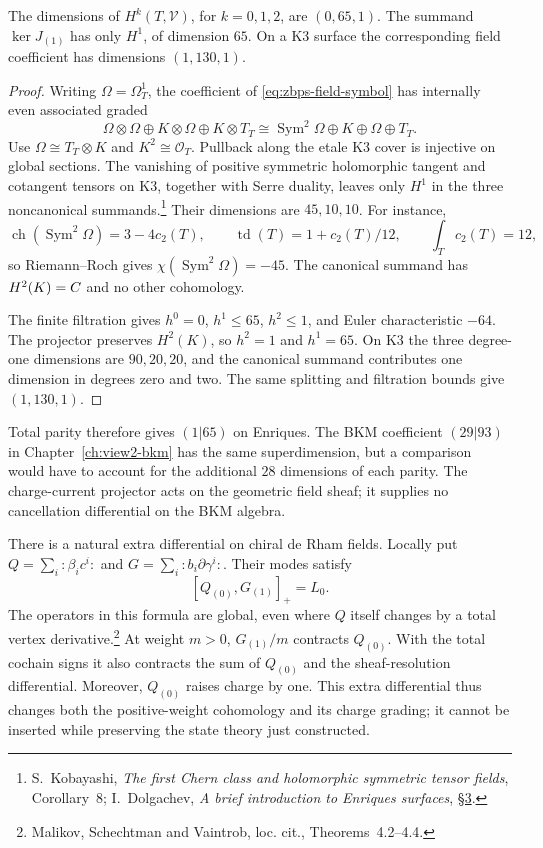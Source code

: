 \begin{theorem}\label{thm:zbps-enriques-coefficient}
The dimensions of \(H^k(T,\mathscr V)\), for \(k=0,1,2\), are
\((0,65,1)\).  The summand \(\ker J_{(1)}\) has only
\(H^1\), of dimension \(65\).  On a K3 surface the corresponding
field coefficient has dimensions \((1,130,1)\).
\end{theorem}
\begin{proof}
Writing \(\Omega=\Omega_T^1\), the coefficient of
\eqref{eq:zbps-field-symbol} has internally even associated graded
\[
 \Omega\otimes\Omega\oplus K\otimes\Omega\oplus K\otimes T_T
 \cong\operatorname{Sym}^2\Omega\oplus K\oplus\Omega\oplus T_T.
\]
Use \(\Omega\cong T_T\otimes K\) and \(K^2\cong\mathcal O_T\).
Pullback along the etale K3 cover is injective on global sections.
The vanishing of positive symmetric holomorphic tangent and
cotangent tensors on K3, together with Serre duality, leaves only
\(H^1\) in the three noncanonical summands.\footnote{
S.~Kobayashi, \emph{The first Chern class and holomorphic symmetric
tensor fields}, Corollary~8; I.~Dolgachev, \emph{A brief introduction
to Enriques surfaces}, \href{https://arxiv.org/abs/1412.7744}{\S3}.}
Their dimensions are \(45,10,10\).  For instance,
\[
 \operatorname{ch}(\operatorname{Sym}^2\Omega)=3-4c_2(T),
 \qquad \operatorname{td}(T)=1+c_2(T)/12,
 \qquad \int_Tc_2(T)=12,
\]
so Riemann--Roch gives \(\chi(\operatorname{Sym}^2\Omega)=-45\).
The canonical summand has \(H^2(K)=C\) and no other cohomology.

The finite filtration gives \(h^0=0\), \(h^1\le65\),
\(h^2\le1\), and Euler characteristic \(-64\).
The projector preserves \(H^2(K)\), so \(h^2=1\) and
\(h^1=65\).  On K3 the three degree-one dimensions are
\(90,20,20\), and the canonical summand contributes one dimension
in degrees zero and two.  The same splitting and filtration bounds
give \((1,130,1)\).
\end{proof}

Total parity therefore gives \((1|65)\) on Enriques.  The BKM
coefficient \((29|93)\) in Chapter~\ref{ch:view2-bkm} has the same
superdimension, but a comparison would have to account for the
additional \(28\) dimensions of each parity.  The charge-current
projector acts on the geometric field sheaf; it supplies no
cancellation differential on the BKM algebra.

There is a natural extra differential on chiral de Rham fields.
Locally put \(Q=\sum_i:\beta_i c^i:\) and
\(G=\sum_i:b_i\partial\gamma^i:\).  Their modes satisfy
\[
 [Q_{(0)},G_{(1)}]_+=L_0.
\]
The operators in this formula are global, even where \(Q\) itself
changes by a total vertex derivative.\footnote{Malikov, Schechtman
and Vaintrob, loc. cit., Theorems~4.2--4.4.}
At weight \(m>0\), \(G_{(1)}/m\) contracts \(Q_{(0)}\).
With the total cochain signs it also contracts the sum of
\(Q_{(0)}\) and the sheaf-resolution differential.  Moreover,
\(Q_{(0)}\) raises charge by one.  This extra differential thus
changes both the positive-weight cohomology and its charge grading;
it cannot be inserted while preserving the state theory just
constructed.

